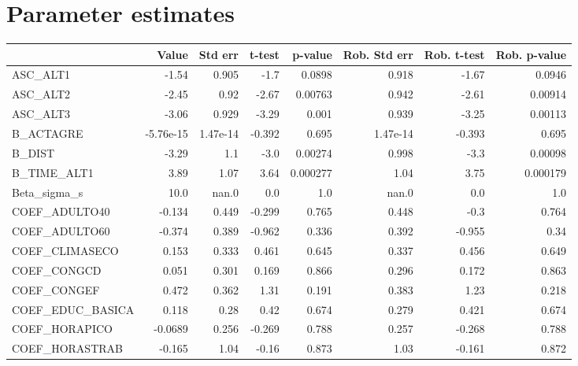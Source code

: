 \section{Parameter estimates}
\begin{tabular}{lrrrrrrr}
\toprule
{} &     Value &  Std err &    t-test &  p-value &  Rob. Std err &  Rob. t-test &  Rob. p-value \\
\midrule
ASC\_ALT1         &     -1.54 &    0.905 &      -1.7 &   0.0898 &         0.918 &        -1.67 &        0.0946 \\
ASC\_ALT2         &     -2.45 &     0.92 &     -2.67 &  0.00763 &         0.942 &        -2.61 &       0.00914 \\
ASC\_ALT3         &     -3.06 &    0.929 &     -3.29 &    0.001 &         0.939 &        -3.25 &       0.00113 \\
B\_ACTAGRE        & -5.76e-15 & 1.47e-14 &    -0.392 &    0.695 &      1.47e-14 &       -0.393 &         0.695 \\
B\_DIST           &     -3.29 &      1.1 &      -3.0 &  0.00274 &         0.998 &         -3.3 &       0.00098 \\
B\_TIME\_ALT1      &      3.89 &     1.07 &      3.64 & 0.000277 &          1.04 &         3.75 &      0.000179 \\
Beta\_sigma\_s     &      10.0 &    nan.0 &       0.0 &      1.0 &         nan.0 &          0.0 &           1.0 \\
COEF\_ADULTO40    &    -0.134 &    0.449 &    -0.299 &    0.765 &         0.448 &         -0.3 &         0.764 \\
COEF\_ADULTO60    &    -0.374 &    0.389 &    -0.962 &    0.336 &         0.392 &       -0.955 &          0.34 \\
COEF\_CLIMASECO   &     0.153 &    0.333 &     0.461 &    0.645 &         0.337 &        0.456 &         0.649 \\
COEF\_CONGCD      &     0.051 &    0.301 &     0.169 &    0.866 &         0.296 &        0.172 &         0.863 \\
COEF\_CONGEF      &     0.472 &    0.362 &      1.31 &    0.191 &         0.383 &         1.23 &         0.218 \\
COEF\_EDUC\_BASICA &     0.118 &     0.28 &      0.42 &    0.674 &         0.279 &        0.421 &         0.674 \\
COEF\_HORAPICO    &   -0.0689 &    0.256 &    -0.269 &    0.788 &         0.257 &       -0.268 &         0.788 \\
COEF\_HORASTRAB   &    -0.165 &     1.04 &     -0.16 &    0.873 &          1.03 &       -0.161 &         0.872 \\

\end{tabular}
